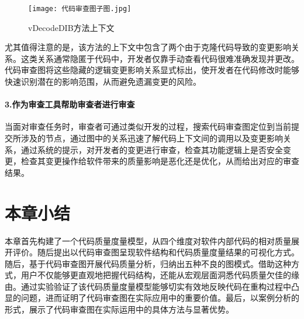 \begin{figure}[h]
\centering
\texttt{[image: 代码审查图子图.jpg]}
\caption{vDecodeDIB方法上下文}
\end{figure}

尤其值得注意的是，该方法的上下文中包含了两个由于克隆代码导致的变更影响关系。这类关系通常隐匿于代码中，开发者仅靠手动查看代码很难准确发现并更改。代码审查图将这些隐藏的逻辑变更影响关系显式标出，使开发者在代码修改时能够快速识别潜在的影响范围，从而避免遗漏变更的风险。

\paragraph{3.作为审查工具帮助审查者进行审查} 当面对审查任务时，审查者可通过类似开发的过程，搜索代码审查图定位到当前提交所涉及的节点，通过图中的关系迅速了解代码上下文间的调用以及变更影响关系，通过系统的提示，对开发者的变更进行审查，检查其功能逻辑上是否安全变更，检查其变更操作给软件带来的质量影响是恶化还是优化，从而给出对应的审查结果。

\section{本章小结}

本章首先构建了一个代码质量度量模型，从四个维度对软件内部代码的相对质量展开评价。随后提出以代码审查图呈现软件结构和代码质量度量结果的可视化方式。随后，基于代码审查图开展代码质量分析，归纳出五种不良的图模式。借助这种方式，用户不仅能够更直观地把握代码结构，还能从宏观层面洞悉代码质量欠佳的缘由。通过实验验证了该代码质量度量模型能够切实有效地反映代码在重构过程中凸显的问题，进而证明了代码审查图在实际应用中的重要价值。最后，以案例分析的形式，展示了代码审查图在实际运用中的具体方法与显著优势。 
